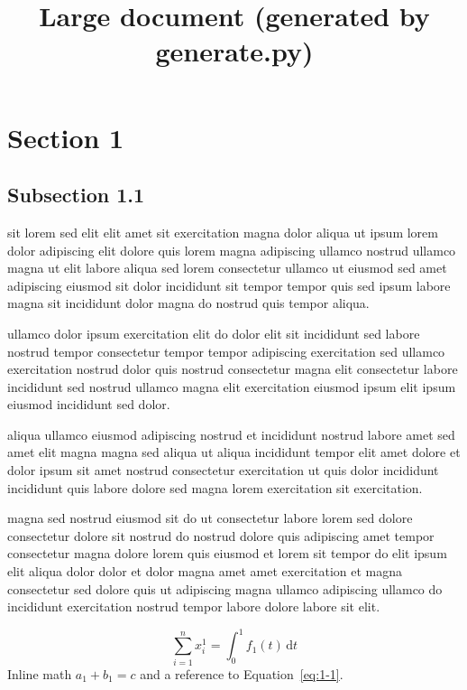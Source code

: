 \documentclass{article}
\title{Large document (generated by generate.py)}
\begin{document}
\maketitle
\tableofcontents

\section{Section 1}\label{sec:1}
\subsection{Subsection 1.1}\label{sec:1-1}
sit lorem sed elit elit amet sit exercitation magna dolor aliqua ut ipsum lorem dolor adipiscing elit dolore quis lorem magna adipiscing ullamco nostrud ullamco magna ut elit labore aliqua sed lorem consectetur ullamco ut eiusmod sed amet adipiscing eiusmod sit dolor incididunt sit tempor tempor quis sed ipsum labore magna sit incididunt dolor magna do nostrud quis tempor aliqua.

ullamco dolor ipsum exercitation elit do dolor elit sit incididunt sed labore nostrud tempor consectetur tempor tempor adipiscing exercitation sed ullamco exercitation nostrud dolor quis nostrud consectetur magna elit consectetur labore incididunt sed nostrud ullamco magna elit exercitation eiusmod ipsum elit ipsum eiusmod incididunt sed dolor.

aliqua ullamco eiusmod adipiscing nostrud et incididunt nostrud labore amet sed amet elit magna magna sed aliqua ut aliqua incididunt tempor elit amet dolore et dolor ipsum sit amet nostrud consectetur exercitation ut quis dolor incididunt incididunt quis labore dolore sed magna lorem exercitation sit exercitation.

magna sed nostrud eiusmod sit do ut consectetur labore lorem sed dolore consectetur dolore sit nostrud do nostrud dolore quis adipiscing amet tempor consectetur magna dolore lorem quis eiusmod et lorem sit tempor do elit ipsum elit aliqua dolor dolor et dolor magna amet amet exercitation et magna consectetur sed dolore quis ut adipiscing magna ullamco adipiscing ullamco do incididunt exercitation nostrud tempor labore dolore labore sit elit.

\begin{equation}\label{eq:1-1}
  \sum_{i=1}^{n} x_i^{1} = \int_0^1 f_{1}(t)\,\mathrm{d}t
\end{equation}
Inline math $a_{1} + b_{1} = c$ and a reference to Equation~\eqref{eq:1-1}.
\end{document}

